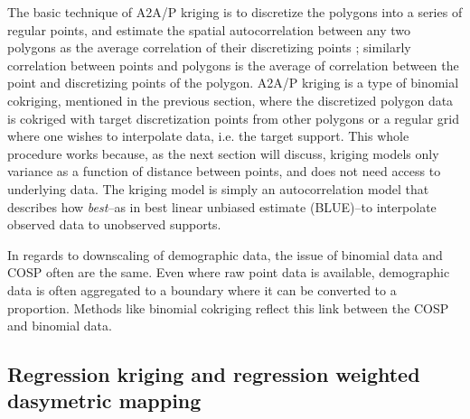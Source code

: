 \documentclass[draft]{article}
\begin{document}
The basic technique of A2A/P kriging is to discretize the polygons into a series of regular points, and estimate the spatial autocorrelation between any two polygons as the average correlation of their discretizing points \cite{kyriakidis04}; similarly correlation between points and polygons is the average of correlation between the point and discretizing points of the polygon.  A2A/P kriging is a type of binomial cokriging, mentioned in the previous section, where the discretized polygon data is cokriged with target discretization points from other polygons or a regular grid where one wishes to interpolate data, i.e. the target support.  This whole procedure works because, as the next section will discuss, kriging models only variance as a function of distance between points, and does not need access to underlying data.  The kriging model is simply an autocorrelation model that describes how {\em best}--as in best linear unbiased estimate (BLUE)--to interpolate observed data to unobserved supports.

In regards to downscaling of demographic data, the issue of binomial data and COSP often are the same.  Even where raw point data is available, demographic data is often aggregated to a boundary where it can be converted to a proportion.  Methods like binomial cokriging reflect this link between the COSP and binomial data.


\subsection{Regression kriging and regression weighted dasymetric mapping}
\end{document}
